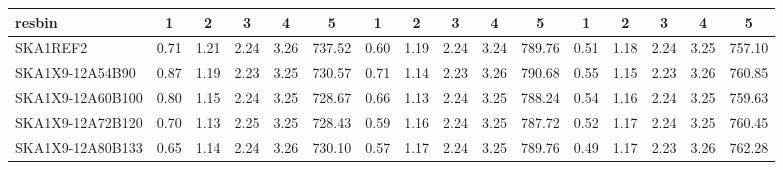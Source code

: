 \begin{table}[H]
{{\begin{tabular}{|lccccc||ccccc||ccccc|}
 resbin  &1 & 2 & 3 & 4 & 5 & 1 & 2 & 3 & 4 & 5 & 1 & 2 & 3 & 4 & 5 \\ \hline
SKA1REF2 & 0.71 \cellcolor{blue!29.98} & 1.21 \cellcolor{red!60.00} & 2.24 \cellcolor{green!42.92} & 3.26 \cellcolor{orange!58.03} & 737.52 \cellcolor{purple!60.00} & 0.60 \cellcolor{blue!25.71} & 1.19 \cellcolor{red!60.00} & 2.24 \cellcolor{green!55.48} & 3.24 \cellcolor{orange!18.00} & 789.76 \cellcolor{purple!47.02} & 0.51 \cellcolor{blue!35.29} & 1.18 \cellcolor{red!60.00} & 2.24 \cellcolor{green!47.30} & 3.25 \cellcolor{orange!20.04} & 757.10 \cellcolor{purple!18.00}\\ \hline 
SKA1X9-12A54B90 & 0.87 \cellcolor{blue!60.00} & 1.19 \cellcolor{red!49.31} & 2.23 \cellcolor{green!18.00} & 3.25 \cellcolor{orange!39.66} & 730.57 \cellcolor{purple!27.92} & 0.71 \cellcolor{blue!60.00} & 1.14 \cellcolor{red!21.71} & 2.23 \cellcolor{green!18.00} & 3.26 \cellcolor{orange!60.00} & 790.68 \cellcolor{purple!60.00} & 0.55 \cellcolor{blue!60.00} & 1.15 \cellcolor{red!18.00} & 2.23 \cellcolor{green!18.00} & 3.26 \cellcolor{orange!60.00} & 760.85 \cellcolor{purple!48.38}\\ \hline 
SKA1X9-12A60B100 & 0.80 \cellcolor{blue!46.74} & 1.15 \cellcolor{red!28.51} & 2.24 \cellcolor{green!51.46} & 3.25 \cellcolor{orange!18.00} & 728.67 \cellcolor{purple!19.10} & 0.66 \cellcolor{blue!44.02} & 1.13 \cellcolor{red!18.00} & 2.24 \cellcolor{green!33.35} & 3.25 \cellcolor{orange!53.70} & 788.24 \cellcolor{purple!25.32} & 0.54 \cellcolor{blue!51.05} & 1.16 \cellcolor{red!34.05} & 2.24 \cellcolor{green!60.00} & 3.25 \cellcolor{orange!28.19} & 759.63 \cellcolor{purple!38.51}\\ \hline 
SKA1X9-12A72B120 & 0.70 \cellcolor{blue!27.88} & 1.13 \cellcolor{red!18.00} & 2.25 \cellcolor{green!60.00} & 3.25 \cellcolor{orange!25.22} & 728.43 \cellcolor{purple!18.00} & 0.59 \cellcolor{blue!23.48} & 1.16 \cellcolor{red!36.56} & 2.24 \cellcolor{green!22.97} & 3.25 \cellcolor{orange!49.15} & 787.72 \cellcolor{purple!18.00} & 0.52 \cellcolor{blue!35.67} & 1.17 \cellcolor{red!55.05} & 2.24 \cellcolor{green!58.05} & 3.25 \cellcolor{orange!18.00} & 760.45 \cellcolor{purple!45.13}\\ \hline 
SKA1X9-12A80B133 & 0.65 \cellcolor{blue!18.00} & 1.14 \cellcolor{red!20.99} & 2.24 \cellcolor{green!51.69} & 3.26 \cellcolor{orange!60.00} & 730.10 \cellcolor{purple!25.73} & 0.57 \cellcolor{blue!18.00} & 1.17 \cellcolor{red!45.98} & 2.24 \cellcolor{green!60.00} & 3.25 \cellcolor{orange!46.00} & 789.76 \cellcolor{purple!47.00} & 0.49 \cellcolor{blue!18.00} & 1.17 \cellcolor{red!51.12} & 2.23 \cellcolor{green!27.12} & 3.26 \cellcolor{orange!56.33} & 762.28 \cellcolor{purple!60.00}\\ \hline 

\end{tabular}}}
\end{table}
